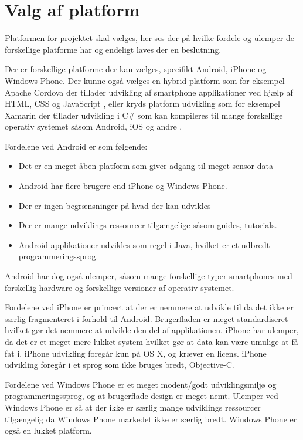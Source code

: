 \section{Valg af platform}\label{sec:valg_af_android}
Platformen for projektet skal vælges, her ses der på hvilke fordele og ulemper de forskellige platforme har og endeligt laves der en beslutning.

Der er forskellige platforme der kan vælges, specifikt Android, iPhone og Windows Phone.
Der kunne også vælges en hybrid platform som for eksempel Apache Cordova der tillader udvikling af smartphone applikationer ved hjælp af HTML, CSS og JavaScript \citep{misc:apachecordova}, eller kryds platform udvikling som for eksempel Xamarin der tillader udvikling i C\# som kan kompileres til mange forskellige operativ systemet såsom Android, iOS og andre \citep{misc:xamarin}.

Fordelene ved Android er som følgende:
\begin{itemize}
\item Det er en meget åben platform som giver adgang til meget sensor data
\item Android har flere brugere end iPhone og Windows Phone.
\item Der er ingen begrænsninger på hvad der kan udvikles
\item Der er mange udviklings ressourcer tilgængelige såsom guides, tutorials.
\item Android applikationer udvikles som regel i Java, hvilket er et udbredt programmeringssprog.
\end{itemize}

Android har dog også ulemper, såsom mange forskellige typer smartphones med forskellig hardware og forskellige versioner af operativ systemet.

Fordelene ved iPhone er primært at der er nemmere at udvikle til da det ikke er særlig fragmenteret i forhold til Android. 
Brugerfladen er meget standardiseret hvilket gør det nemmere at udvikle den del af applikationen. 
iPhone har ulemper, da det er et meget mere lukket system hvilket gør at data kan være umulige at få fat i. iPhone udvikling foregår kun på OS X, og kræver en licens. iPhone udvikling foregår i et sprog som ikke bruges bredt, Objective-C.

Fordelene ved Windows Phone er et meget modent/godt udviklingsmiljø og programmeringssprog, og at brugerflade design er meget nemt. 
Ulemper ved Windows Phone er så at der ikke er særlig mange udviklings ressourcer tilgængelig da Windows Phone markedet ikke er særlig bredt. Windows Phone er også en lukket platform.

